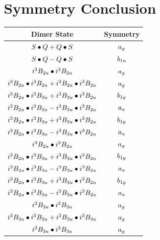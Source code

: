 \documentclass{article}
\begin{document}
\section{Symmetry Conclusion} 
\begin{table}[H]
\centering
\begin{tabular}{cc}
\hline
Dimer State & Symmetry \\[0.1cm] 
\hline
$S \bullet Q + Q \bullet S \displaystyle $ & $a_{g} \displaystyle $ \\[0.1cm] 
$S \bullet Q - Q \bullet S \displaystyle $ & $b_{1u} \displaystyle $ \\[0.1cm] 
$i^3 B_{2u} \bullet i^3 B_{2u} \displaystyle $ & $a_{g} \displaystyle $ \\[0.1cm] 
$i^3 B_{2u} \bullet i^3 B_{2u} + i^3 B_{2u} \bullet i^3 B_{2u} \displaystyle $ & $a_{g} \displaystyle $ \\[0.1cm] 
$i^3 B_{2u} \bullet i^3 B_{3u} + i^3 B_{3u} \bullet i^3 B_{2u} \displaystyle $ & $b_{1g} \displaystyle $ \\[0.1cm] 
$i^3 B_{2u} \bullet i^3 B_{3u} - i^3 B_{3u} \bullet i^3 B_{2u} \displaystyle $ & $a_{u} \displaystyle $ \\[0.1cm] 
$i^3 B_{2u} \bullet i^3 B_{3u} + i^3 B_{3u} \bullet i^3 B_{2u} \displaystyle $ & $b_{1g} \displaystyle $ \\[0.1cm] 
$i^3 B_{2u} \bullet i^3 B_{3u} - i^3 B_{3u} \bullet i^3 B_{2u} \displaystyle $ & $a_{u} \displaystyle $ \\[0.1cm] 
$i^3 B_{2u} \bullet i^3 B_{2u} \displaystyle $ & $a_{g} \displaystyle $ \\[0.1cm] 
$i^3 B_{2u} \bullet i^3 B_{3u} + i^3 B_{3u} \bullet i^3 B_{2u} \displaystyle $ & $b_{1g} \displaystyle $ \\[0.1cm] 
$i^3 B_{2u} \bullet i^3 B_{3u} - i^3 B_{3u} \bullet i^3 B_{2u} \displaystyle $ & $a_{u} \displaystyle $ \\[0.1cm] 
$i^3 B_{2u} \bullet i^3 B_{3u} + i^3 B_{3u} \bullet i^3 B_{2u} \displaystyle $ & $b_{1g} \displaystyle $ \\[0.1cm] 
$i^3 B_{2u} \bullet i^3 B_{3u} - i^3 B_{3u} \bullet i^3 B_{2u} \displaystyle $ & $a_{u} \displaystyle $ \\[0.1cm] 
$i^3 B_{3u} \bullet i^3 B_{3u} \displaystyle $ & $a_{g} \displaystyle $ \\[0.1cm] 
$i^3 B_{3u} \bullet i^3 B_{3u} + i^3 B_{3u} \bullet i^3 B_{3u} \displaystyle $ & $a_{g} \displaystyle $ \\[0.1cm] 
$i^3 B_{3u} \bullet i^3 B_{3u} \displaystyle $ & $a_{g} \displaystyle $ \\[0.1cm] 
\hline
\end{tabular}
\end{table}
\end{document}
